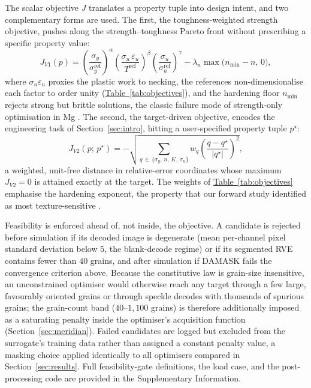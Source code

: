 \documentclass[preprint,12pt]{elsarticle}
\newcommand{\tabref}[1]{\hyperref[#1]{Table~\ref*{#1}}}
\begin{document}
The scalar objective $J$ translates a property tuple into design intent, and two complementary forms are used. The first, the toughness-weighted strength objective, pushes along the strength--toughness Pareto front without prescribing a specific property value:
\begin{equation}
  J_{V1}(p) = \left( \frac{\sigma_y}{\sigma_y^{\mathrm{ref}}} \right)^{\!\alpha}
  \left( \frac{\sigma_u\,\varepsilon_u}{T^{\mathrm{ref}}} \right)^{\!\beta}
  \left( \frac{\sigma_u}{\sigma_u^{\mathrm{ref}}} \right)^{\!\gamma}
  - \lambda_n \max\!\big(n_{\min} - n,\, 0\big),
  \label{eq:jv1}
\end{equation}
where $\sigma_u \varepsilon_u$ proxies the plastic work to necking, the references non-dimensionalise each factor to order unity (\tabref{tab:objectives}), and the hardening floor $n_{\min}$ rejects strong but brittle solutions, the classic failure mode of strength-only optimisation in Mg \cite{Agnew-Review-Mg-2006}. The second, the target-driven objective, encodes the engineering task of Section~\ref{sec:intro}, hitting a user-specified property tuple $p^\star$:
\begin{equation}
  J_{V2}(p;\, p^\star) = - \sqrt{ \sum_{q \,\in\, \{\sigma_y,\, n,\, K,\, \sigma_u\}} w_q \left( \frac{q - q^\star}{|q^\star|} \right)^{\!2} },
  \label{eq:jv2}
\end{equation}
a weighted, unit-free distance in relative-error coordinates whose maximum $J_{V2}=0$ is attained exactly at the target. The weights of \tabref{tab:objectives} emphasise the hardening exponent, the property that our forward study identified as most texture-sensitive \cite{Guru2025}.

Feasibility is enforced ahead of, not inside, the objective. A candidate is rejected before simulation if its decoded image is degenerate (mean per-channel pixel standard deviation below $5$, the blank-decode regime) or if its segmented RVE contains fewer than $40$ grains, and after simulation if DAMASK fails the convergence criterion above. Because the constitutive law is grain-size insensitive, an unconstrained optimiser would otherwise reach any target through a few large, favourably oriented grains or through speckle decodes with thousands of spurious grains; the grain-count band ($40$--$1{,}100$ grains) is therefore additionally imposed as a saturating penalty inside the optimiser's acquisition function (Section~\ref{sec:meridian}). Failed candidates are logged but excluded from the surrogate's training data rather than assigned a constant penalty value, a masking choice applied identically to all optimisers compared in Section~\ref{sec:results}. Full feasibility-gate definitions, the load case, and the post-processing code are provided in the Supplementary Information.
\end{document}
